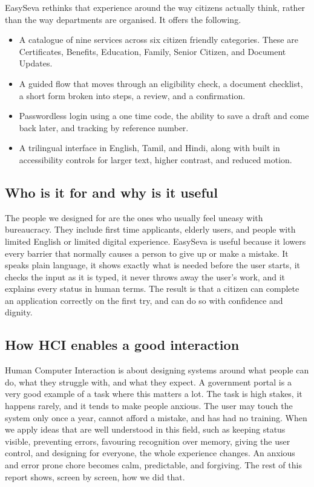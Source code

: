 \documentclass[12pt,a4paper]{article}
\begin{document}
EasySeva rethinks that experience around the way citizens actually think, rather
than the way departments are organised. It offers the following.
\begin{itemize}
  \item A catalogue of nine services across six citizen friendly categories.
        These are Certificates, Benefits, Education, Family, Senior Citizen, and
        Document Updates.
  \item A guided flow that moves through an eligibility check, a document
        checklist, a short form broken into steps, a review, and a confirmation.
  \item Passwordless login using a one time code, the ability to save a draft and
        come back later, and tracking by reference number.
  \item A trilingual interface in English, Tamil, and Hindi, along with built in
        accessibility controls for larger text, higher contrast, and reduced
        motion.
\end{itemize}

\subsection{Who is it for and why is it useful}
The people we designed for are the ones who usually feel uneasy with bureaucracy.
They include first time applicants, elderly users, and people with limited English
or limited digital experience. EasySeva is useful because it lowers every barrier
that normally causes a person to give up or make a mistake. It speaks plain
language, it shows exactly what is needed before the user starts, it checks the
input as it is typed, it never throws away the user's work, and it explains every
status in human terms. The result is that a citizen can complete an application
correctly on the first try, and can do so with confidence and dignity.

\subsection{How HCI enables a good interaction}
Human Computer Interaction is about designing systems around what people can do,
what they struggle with, and what they expect. A government portal is a very good
example of a task where this matters a lot. The task is high stakes, it happens
rarely, and it tends to make people anxious. The user may touch the system only
once a year, cannot afford a mistake, and has had no training. When we apply ideas
that are well understood in this field, such as keeping status visible, preventing
errors, favouring recognition over memory, giving the user control, and designing
for everyone, the whole experience changes. An anxious and error prone chore
becomes calm, predictable, and forgiving. The rest of this report shows, screen by
screen, how we did that.
\end{document}
